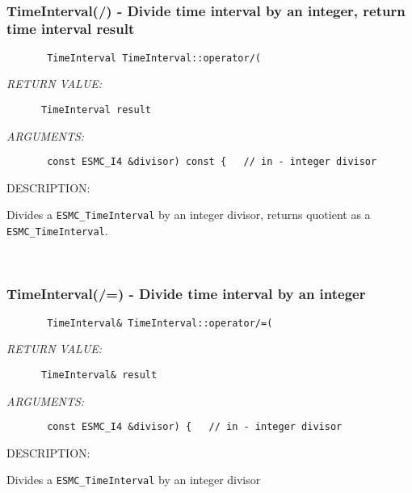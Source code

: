  
\mbox{}\hrulefill\ 
 
\subsubsection [TimeInterval(/)] {TimeInterval(/) - Divide time interval by an integer, return time interval result}


  
\begin{verbatim}       TimeInterval TimeInterval::operator/(\end{verbatim}{\em RETURN VALUE:}
\begin{verbatim}      TimeInterval result\end{verbatim}{\em ARGUMENTS:}
\begin{verbatim}       const ESMC_I4 &divisor) const {   // in - integer divisor\end{verbatim}
{\sf DESCRIPTION:\\ }


      Divides a {\tt ESMC\_TimeInterval} by an integer divisor,
      returns quotient as a {\tt ESMC\_TimeInterval}.
   
 
\mbox{}\hrulefill\ 
 
\subsubsection [TimeInterval(/=)] {TimeInterval(/=) - Divide time interval by an integer}


  
\begin{verbatim}       TimeInterval& TimeInterval::operator/=(\end{verbatim}{\em RETURN VALUE:}
\begin{verbatim}      TimeInterval& result\end{verbatim}{\em ARGUMENTS:}
\begin{verbatim}       const ESMC_I4 &divisor) {   // in - integer divisor\end{verbatim}
{\sf DESCRIPTION:\\ }


      Divides a {\tt ESMC\_TimeInterval} by an integer divisor
   
 
